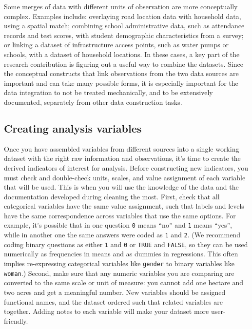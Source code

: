 Some merges of data with different units of observation
are more conceptually complex.
Examples include: overlaying road location data with household data,
using a spatial match; combining school administrative data, such as attendance records and test scores,
with student demographic characteristics from a survey;
or linking a dataset of infrastructure access points, such as water pumps or schools,
with a dataset of household locations.
In these cases, a key part of the research contribution is figuring out
a useful way to combine the datasets.
Since the conceptual constructs that link observations from the two data sources
are important and can take many possible forms,
it is especially important for the data integration to not be treated mechanically,
and to be extensively documented, separately from other data construction tasks.


\subsection{Creating analysis variables}

Once you have assembled variables from different sources into a single working dataset
with the right raw information and observations,
it's time to create the derived indicators of interest for analysis.
Before constructing new indicators,
you must check and double-check units, scales, and value assignment of each variable that will be used.
This is when you will use the knowledge
of the data and the documentation developed during cleaning the most.
First, check that all categorical variables have the same value assignment,
such that labels and levels have the same correspondence across variables that use the same options.
For example, it's possible that in one question \texttt{0} means ``no'' and \texttt{1} means ``yes'',
while in another one the same answers were coded as \texttt{1} and \texttt{2}.
(We recommend coding binary questions as either \texttt{1} and \texttt{0} or \texttt{TRUE} and \texttt{FALSE},
so they can be used numerically as frequencies in means and as dummies in regressions.
This often implies re-expressing categorical variables like \texttt{gender} to binary variables like \texttt{woman}.)
Second, make sure that any numeric variables you are comparing
are converted to the same scale or unit of measure:
you cannot add one hectare and two acres and get a meaningful number.
New variables should be assigned functional names,
and the dataset ordered such that related variables are together.
Adding notes to each variable will make your dataset more user-friendly.

